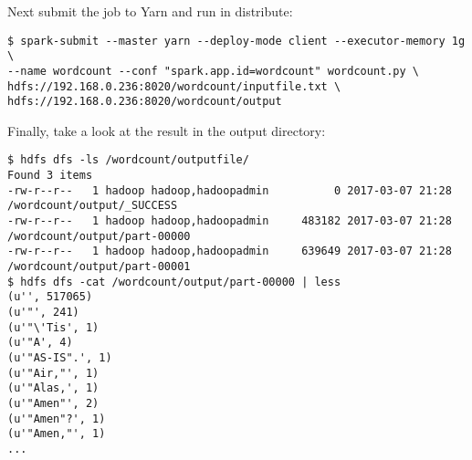 Next submit the job to Yarn and run in distribute:

\begin{verbatim}
$ spark-submit --master yarn --deploy-mode client --executor-memory 1g \
--name wordcount --conf "spark.app.id=wordcount" wordcount.py \
hdfs://192.168.0.236:8020/wordcount/inputfile.txt \
hdfs://192.168.0.236:8020/wordcount/output
\end{verbatim}

Finally, take a look at the result in the output directory:

\begin{verbatim}
$ hdfs dfs -ls /wordcount/outputfile/
Found 3 items
-rw-r--r--   1 hadoop hadoop,hadoopadmin          0 2017-03-07 21:28 /wordcount/output/_SUCCESS
-rw-r--r--   1 hadoop hadoop,hadoopadmin     483182 2017-03-07 21:28 /wordcount/output/part-00000
-rw-r--r--   1 hadoop hadoop,hadoopadmin     639649 2017-03-07 21:28 /wordcount/output/part-00001
$ hdfs dfs -cat /wordcount/output/part-00000 | less
(u'', 517065)
(u'"', 241)
(u'"\'Tis', 1)
(u'"A', 4)
(u'"AS-IS".', 1)
(u'"Air,"', 1)
(u'"Alas,', 1)
(u'"Amen"', 2)
(u'"Amen"?', 1)
(u'"Amen,"', 1)
...
\end{verbatim}
